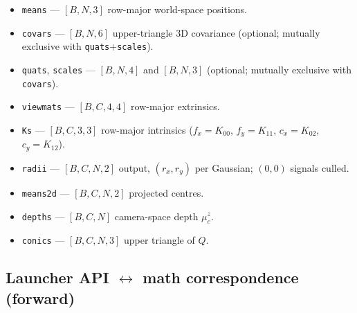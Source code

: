 \documentclass[11pt]{article}
\begin{document}
\begin{itemize}
  \item \texttt{means} --- $[B, N, 3]$ row-major world-space positions.
  \item \texttt{covars} --- $[B, N, 6]$ upper-triangle 3D covariance
  (optional; mutually exclusive with \texttt{quats}+\texttt{scales}).
  \item \texttt{quats}, \texttt{scales} --- $[B, N, 4]$ and $[B, N, 3]$
  (optional; mutually exclusive with \texttt{covars}).
  \item \texttt{viewmats} --- $[B, C, 4, 4]$ row-major extrinsics.
  \item \texttt{Ks} --- $[B, C, 3, 3]$ row-major intrinsics
  ($f_x = K_{00}$, $f_y = K_{11}$, $c_x = K_{02}$, $c_y = K_{12}$).
  \item \texttt{radii} --- $[B, C, N, 2]$ output, $(r_x, r_y)$ per
  Gaussian; $(0, 0)$ signals culled.
  \item \texttt{means2d} --- $[B, C, N, 2]$ projected centres.
  \item \texttt{depths} --- $[B, C, N]$ camera-space depth $\mu_c^z$.
  \item \texttt{conics} --- $[B, C, N, 3]$ upper triangle of $Q$.
\end{itemize}

\subsection{Launcher API \texorpdfstring{$\leftrightarrow$}{<->} math correspondence (forward)}
\end{document}
